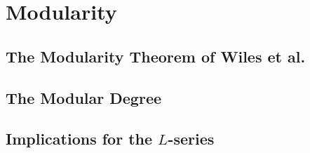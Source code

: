 \chapter{Modularity}
 \section{The Modularity Theorem of Wiles et al.}\label{sec:modularity}
 \section{The Modular Degree}
 \section{Implications for the $L$-series}



